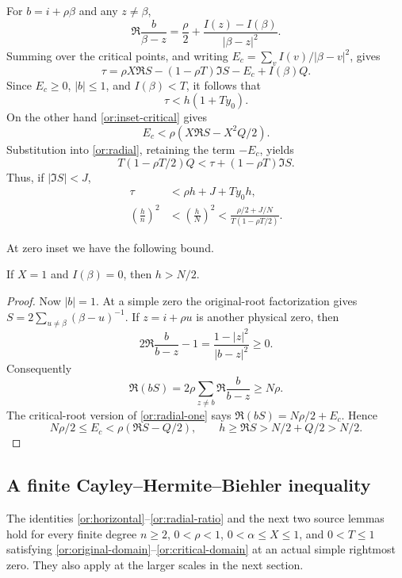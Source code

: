 For $b=i+\rho\beta$ and any $z\ne\beta$,
\begin{equation}\label{or:radial-one}
 \Re\frac b{\beta-z}
       =\frac\rho2+\frac{I(z)-I(\beta)}{|\beta-z|^2}.
\end{equation}
Summing over the critical points, and writing
$E_c=\sum_v I(v)/|\beta-v|^2$, gives
\begin{equation}\label{or:radial}
 \tau=\rho X\Re S-(1-\rho T)\Im S-E_c+I(\beta)Q.
\end{equation}
Since $E_c\ge0$, $|b|\le1$, and $I(\beta)<T$, it follows that
\begin{equation}\label{or:radial-unphased}
                         \tau<h(1+Ty_0).
\end{equation}
On the other hand \eqref{or:inset-critical} gives
\[
            E_c<\rho(X\Re S-X^2Q/2).
\]
Substitution into \eqref{or:radial}, retaining the term $-E_c$, yields
\begin{equation}\label{or:radial-sharp}
 T(1-\rho T/2)Q<\tau+(1-\rho T)\Im S.
\end{equation}
Thus, if $|\Im S|<J$,
\begin{align}
 \tau&<\rho h+J+Ty_0h,\label{or:radial-phase}\\
 \left(\frac hn\right)^2
 &<\left(\frac hN\right)^2
 <\frac{\rho/2+J/N}{T(1-\rho T/2)}.\label{or:radial-ratio}
\end{align}

At zero inset we have the following bound.
\begin{lemma}\label{or:zero-inset}
If $X=1$ and $I(\beta)=0$, then $h>N/2$.
\end{lemma}
\begin{proof}
Now $|b|=1$.  At a simple zero the original-root factorization gives
$S=2\sum_{u\ne\beta}(\beta-u)^{-1}$.  If $z=i+\rho u$ is another
physical zero, then
\[
 2\Re\frac b{b-z}-1=\frac{1-|z|^2}{|b-z|^2}\ge0.
\]
Consequently
\[
 \Re(bS)=2\rho\sum_{z\ne b}\Re\frac b{b-z}\ge N\rho.
\]
The critical-root version of \eqref{or:radial-one} says
$\Re(bS)=N\rho/2+E_c$.  Hence
\[
 N\rho/2\le E_c<\rho(\Re S-Q/2),
 \qquad h\ge\Re S>N/2+Q/2>N/2.
\]
\end{proof}

\subsection{A finite Cayley--Hermite--Biehler inequality}

The identities \eqref{or:horizontal}--\eqref{or:radial-ratio} and the
next two source lemmas hold for every finite degree $n\ge2$,
$0<\rho<1$, $0<\alpha\le X\le1$, and $0<T\le1$ satisfying
\eqref{or:original-domain}--\eqref{or:critical-domain} at an actual
simple rightmost zero.  They also apply at the larger scales in the
next section.

